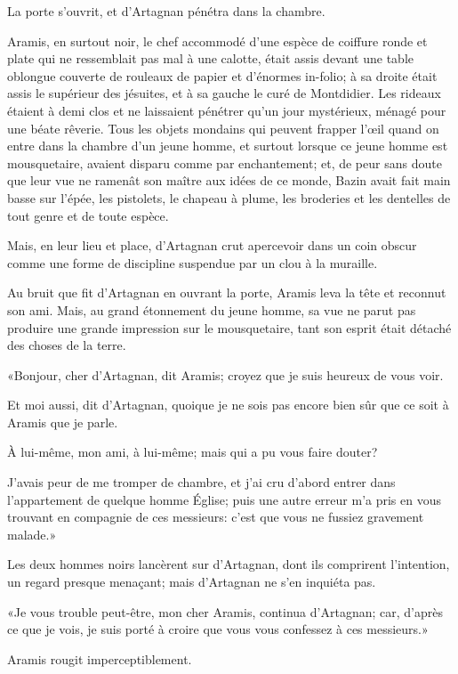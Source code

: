 La porte s'ouvrit, et d'Artagnan pénétra dans la chambre. 

Aramis, en surtout noir, le chef accommodé d'une espèce de coiffure ronde et plate qui ne ressemblait pas mal à une calotte, était assis devant une table oblongue couverte de rouleaux de papier et d'énormes in-folio; à sa droite était assis le supérieur des jésuites, et à sa gauche le curé de Montdidier. Les rideaux étaient à demi clos et ne laissaient pénétrer qu'un jour mystérieux, ménagé pour une béate rêverie. Tous les objets mondains qui peuvent frapper l'œil quand on entre dans la chambre d'un jeune homme, et surtout lorsque ce jeune homme est mousquetaire, avaient disparu comme par enchantement; et, de peur sans doute que leur vue ne ramenât son maître aux idées de ce monde, Bazin avait fait main basse sur l'épée, les pistolets, le chapeau à plume, les broderies et les dentelles de tout genre et de toute espèce. 

Mais, en leur lieu et place, d'Artagnan crut apercevoir dans un coin obscur comme une forme de discipline suspendue par un clou à la muraille. 

Au bruit que fit d'Artagnan en ouvrant la porte, Aramis leva la tête et reconnut son ami. Mais, au grand étonnement du jeune homme, sa vue ne parut pas produire une grande impression sur le mousquetaire, tant son esprit était détaché des choses de la terre. 

«Bonjour, cher d'Artagnan, dit Aramis; croyez que je suis heureux de vous voir. 

\speak  Et moi aussi, dit d'Artagnan, quoique je ne sois pas encore bien sûr que ce soit à Aramis que je parle. 

\speak  À lui-même, mon ami, à lui-même; mais qui a pu vous faire douter? 

\speak  J'avais peur de me tromper de chambre, et j'ai cru d'abord entrer dans l'appartement de quelque homme Église; puis une autre erreur m'a pris en vous trouvant en compagnie de ces messieurs: c'est que vous ne fussiez gravement malade.» 

Les deux hommes noirs lancèrent sur d'Artagnan, dont ils comprirent l'intention, un regard presque menaçant; mais d'Artagnan ne s'en inquiéta pas. 

«Je vous trouble peut-être, mon cher Aramis, continua d'Artagnan; car, d'après ce que je vois, je suis porté à croire que vous vous confessez à ces messieurs.» 

Aramis rougit imperceptiblement. 

